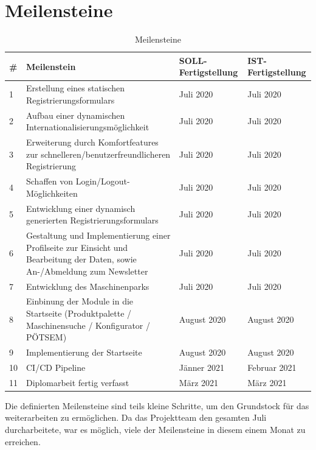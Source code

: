 \section{Meilensteine}
\begin{table}[H]
	\centering
{
\begin{tabular}[h]{|l|p{8cm}|p{2.5cm}|p{2.5cm}|}
	\hline
	\# & Meilenstein & SOLL-Fertigstellung & IST-Fertigstellung \\
	\hline
	1 & Erstellung eines statischen Registrierungsformulars & Juli 2020 & Juli 2020 \\
	\hline
	2 & Aufbau einer dynamischen Internationalisierungsmöglichkeit & Juli 2020 & Juli 2020 \\	
	\hline
	3 & Erweiterung durch Komfortfeatures zur schnelleren/benutzerfreundlicheren Registrierung & Juli 2020 & Juli 2020 \\
	\hline
	4 & Schaffen von Login/Logout-Möglichkeiten & Juli 2020 & Juli 2020 \\	
	\hline
	5 & Entwicklung einer dynamisch generierten Registrierungsformulars & Juli 2020 & Juli 2020 \\	
	\hline
	6 & Gestaltung und Implementierung einer Profilseite zur Einsicht und Bearbeitung der Daten, sowie An-/Abmeldung zum Newsletter & Juli 2020 & Juli 2020 \\	
	\hline
	7 & Entwicklung des Maschinenparks & Juli 2020 & Juli 2020 \\	
	\hline
	8 & Einbinung der Module in die Startseite (Produktpalette / Maschinensuche / Konfigurator / PÖTSEM) & August 2020 & August 2020 \\	
	\hline
	9 & Implementierung der Startseite & August 2020 & August 2020 \\	
	\hline
	10 & CI/CD Pipeline & Jänner 2021 & Februar 2021 \\	
	\hline	
	11 & Diplomarbeit fertig verfasst & März 2021 & März 2021 \\
	\hline
\end{tabular}
}
\caption{Meilensteine}
\end{table}
Die definierten Meilensteine sind teils kleine Schritte, um den Grundstock für das weiterarbeiten zu ermöglichen. Da das Projektteam den gesamten Juli durcharbeitete, war es möglich, viele der Meilensteine in diesem einem Monat zu erreichen. 

